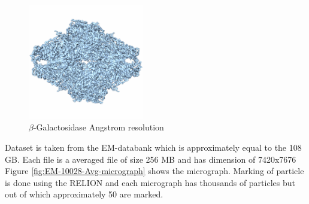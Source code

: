 \documentclass{report}
\begin{document}
\begin{figure}[h]
\includegraphics[width=0.45\textwidth]{EMPIAR-10012}
\centering
\captionsetup{justification=centering}
\caption{ $\beta$-Galactosidase\protect{} Angstrom resolution}
\label{fig:EMPIAR-10012-3d-struct}
\end{figure}

Dataset is taken from the EM-databank which is approximately equal to the 108 GB. Each file is a averaged file of size 256 MB and has dimension of 7420x7676 Figure \ref{fig:EM-10028-Avg-micrograph} shows the micrograph. Marking of particle is done using the RELION and each micrograph has thousands of particles but out of which approximately 50 are marked.
\end{document}
